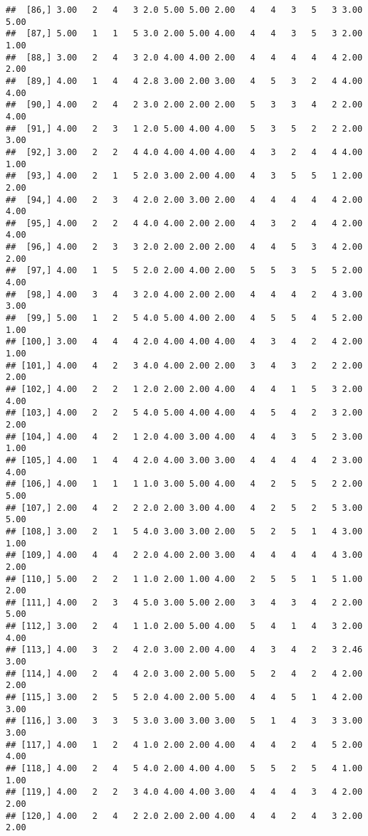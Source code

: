 \documentclass[]{article}
\begin{document}
\begin{verbatim}
##  [86,] 3.00   2   4   3 2.0 5.00 5.00 2.00   4   4   3   5   3 3.00 5.00
##  [87,] 5.00   1   1   5 3.0 2.00 5.00 4.00   4   4   3   5   3 2.00 1.00
##  [88,] 3.00   2   4   3 2.0 4.00 4.00 2.00   4   4   4   4   4 2.00 2.00
##  [89,] 4.00   1   4   4 2.8 3.00 2.00 3.00   4   5   3   2   4 4.00 4.00
##  [90,] 4.00   2   4   2 3.0 2.00 2.00 2.00   5   3   3   4   2 2.00 4.00
##  [91,] 4.00   2   3   1 2.0 5.00 4.00 4.00   5   3   5   2   2 2.00 3.00
##  [92,] 3.00   2   2   4 4.0 4.00 4.00 4.00   4   3   2   4   4 4.00 1.00
##  [93,] 4.00   2   1   5 2.0 3.00 2.00 4.00   4   3   5   5   1 2.00 2.00
##  [94,] 4.00   2   3   4 2.0 2.00 3.00 2.00   4   4   4   4   4 2.00 4.00
##  [95,] 4.00   2   2   4 4.0 4.00 2.00 2.00   4   3   2   4   4 2.00 4.00
##  [96,] 4.00   2   3   3 2.0 2.00 2.00 2.00   4   4   5   3   4 2.00 2.00
##  [97,] 4.00   1   5   5 2.0 2.00 4.00 2.00   5   5   3   5   5 2.00 4.00
##  [98,] 4.00   3   4   3 2.0 4.00 2.00 2.00   4   4   4   2   4 3.00 3.00
##  [99,] 5.00   1   2   5 4.0 5.00 4.00 2.00   4   5   5   4   5 2.00 1.00
## [100,] 3.00   4   4   4 2.0 4.00 4.00 4.00   4   3   4   2   4 2.00 1.00
## [101,] 4.00   4   2   3 4.0 4.00 2.00 2.00   3   4   3   2   2 2.00 2.00
## [102,] 4.00   2   2   1 2.0 2.00 2.00 4.00   4   4   1   5   3 2.00 4.00
## [103,] 4.00   2   2   5 4.0 5.00 4.00 4.00   4   5   4   2   3 2.00 2.00
## [104,] 4.00   4   2   1 2.0 4.00 3.00 4.00   4   4   3   5   2 3.00 1.00
## [105,] 4.00   1   4   4 2.0 4.00 3.00 3.00   4   4   4   4   2 3.00 4.00
## [106,] 4.00   1   1   1 1.0 3.00 5.00 4.00   4   2   5   5   2 2.00 5.00
## [107,] 2.00   4   2   2 2.0 2.00 3.00 4.00   4   2   5   2   5 3.00 5.00
## [108,] 3.00   2   1   5 4.0 3.00 3.00 2.00   5   2   5   1   4 3.00 1.00
## [109,] 4.00   4   4   2 2.0 4.00 2.00 3.00   4   4   4   4   4 3.00 2.00
## [110,] 5.00   2   2   1 1.0 2.00 1.00 4.00   2   5   5   1   5 1.00 2.00
## [111,] 4.00   2   3   4 5.0 3.00 5.00 2.00   3   4   3   4   2 2.00 5.00
## [112,] 3.00   2   4   1 1.0 2.00 5.00 4.00   5   4   1   4   3 2.00 4.00
## [113,] 4.00   3   2   4 2.0 3.00 2.00 4.00   4   3   4   2   3 2.46 3.00
## [114,] 4.00   2   4   4 2.0 3.00 2.00 5.00   5   2   4   2   4 2.00 2.00
## [115,] 3.00   2   5   5 2.0 4.00 2.00 5.00   4   4   5   1   4 2.00 3.00
## [116,] 3.00   3   3   5 3.0 3.00 3.00 3.00   5   1   4   3   3 3.00 3.00
## [117,] 4.00   1   2   4 1.0 2.00 2.00 4.00   4   4   2   4   5 2.00 4.00
## [118,] 4.00   2   4   5 4.0 2.00 4.00 4.00   5   5   2   5   4 1.00 1.00
## [119,] 4.00   2   2   3 4.0 4.00 4.00 3.00   4   4   4   3   4 2.00 2.00
## [120,] 4.00   2   4   2 2.0 2.00 2.00 4.00   4   4   2   4   3 2.00 2.00

\end{verbatim}
\end{document}
